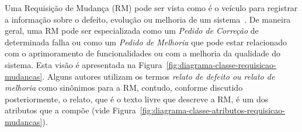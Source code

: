 





Uma Requisição de Mudança (RM) pode ser vista como é o veículo para registrar a
informação sobre o defeito, evolução ou melhoria de um
sistema~\cite{tripathy2014software}. De maneira geral, uma RM pode ser
especializada como um \textit{Pedido de Correção} de determinada falha ou como
um \textit{Pedido de Melhoria} que pode estar relacionado com o aprimoramento de
funcionalidades ou com a melhoria da qualidade do sistema. Esta visão é
apresentada na Figura~\ref{fig:diagrama-classe-requisicao-mudancas}. Alguns
autores utilizam os termos \textit{relato de defeito ou relato de melhoria} como
sinônimos para a RM, contudo, conforme discutido posteriormente, o relato, que é
o texto livre que descreve a RM, é um dos atributos que a compõe (vide
Figura~\ref{fig:diagrama-classe-atributos-requisicao-mudancas}).

